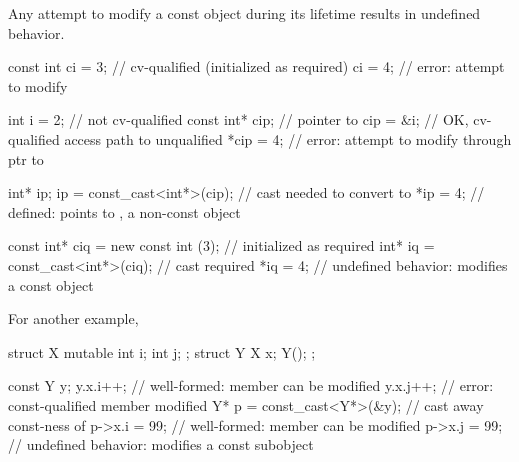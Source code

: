 \pnum
{}%
Any attempt to modify a
const object during its
lifetime results in undefined behavior.
%
%
%
%
%
\begin{example}
\begin{codeblock}
const int ci = 3;                       // cv-qualified (initialized as required)
ci = 4;                                 // error: attempt to modify 

int i = 2;                              // not cv-qualified
const int* cip;                         // pointer to 
cip = &i;                               // OK, cv-qualified access path to unqualified
*cip = 4;                               // error: attempt to modify through ptr to 

int* ip;
ip = const_cast<int*>(cip);             // cast needed to convert  to 
*ip = 4;                                // defined:  points to , a non-const object

const int* ciq = new const int (3);     // initialized as required
int* iq = const_cast<int*>(ciq);        // cast required
*iq = 4;                                // undefined behavior: modifies a const object
\end{codeblock}
For another example,
\begin{codeblock}
struct X {
  mutable int i;
  int j;
};
struct Y {
  X x;
  Y();
};

const Y y;
y.x.i++;                                // well-formed:  member can be modified
y.x.j++;                                // error: const-qualified member modified
Y* p = const_cast<Y*>(&y);              // cast away const-ness of 
p->x.i = 99;                            // well-formed:  member can be modified
p->x.j = 99;                            // undefined behavior: modifies a const subobject
\end{codeblock}
\end{example}

